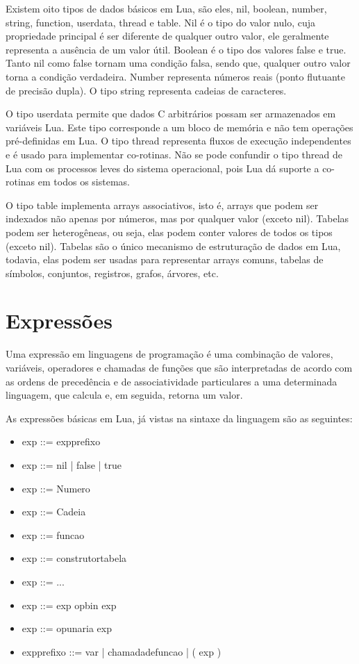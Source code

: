 \documentclass[
12pt, %
openright, %
oneside, %
a4paper, %
english, %
brazil, %
]{abntex2}
\begin{document}
Existem oito tipos de dados básicos em Lua, são eles, nil, boolean, number, string, function, userdata, thread e table. Nil é o tipo do valor nulo, cuja propriedade principal é ser diferente de qualquer outro valor, ele geralmente representa a ausência de um valor útil. Boolean é o tipo dos valores false e true. Tanto nil como false tornam uma condição falsa, sendo que, qualquer outro valor torna a condição verdadeira. Number representa números reais (ponto flutuante de precisão dupla). O tipo string representa cadeias de caracteres.

O tipo userdata permite que dados C arbitrários possam ser armazenados em variáveis Lua. Este tipo corresponde a um bloco de memória e não tem operações pré-definidas em Lua. O tipo thread representa fluxos de execução independentes e é usado para implementar co-rotinas. Não se pode confundir o tipo thread de Lua com os processos leves do sistema operacional, pois Lua dá suporte a co-rotinas em todos os sistemas.

O tipo table implementa arrays associativos, isto é, arrays que podem ser indexados não apenas por números, mas por qualquer valor (exceto nil). Tabelas podem ser heterogêneas, ou seja, elas podem conter valores de todos os tipos (exceto nil). Tabelas são o único mecanismo de estruturação de dados em Lua, todavia, elas podem ser usadas para representar arrays comuns, tabelas de símbolos, conjuntos, registros, grafos, árvores, etc.

\chapter{Expressões}
Uma expressão em linguagens de programação é uma combinação de valores, variáveis, operadores e chamadas de funções que são interpretadas de acordo com as ordens de precedência e de associatividade particulares a uma determinada linguagem, que calcula e, em seguida, retorna um valor.

As expressões básicas em Lua, já vistas na sintaxe da linguagem são as seguintes:
\begin{itemize}
\item exp ::= expprefixo
\item exp ::= nil | false | true
\item exp ::= Numero
\item exp ::= Cadeia
\item exp ::= funcao
\item exp ::= construtortabela
\item exp ::= ...
\item exp ::= exp opbin exp
\item exp ::= opunaria exp
\item expprefixo ::= var | chamadadefuncao | ( exp )
\end{itemize}
\end{document}
